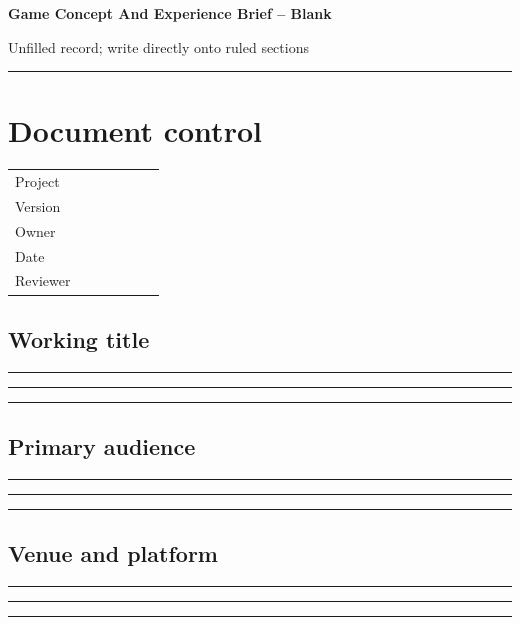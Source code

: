 \documentclass[11pt]{article}
\begin{document}
{\huge\bfseries\color{suiteblue} Game Concept And Experience Brief -- Blank}\par
\vspace{0.15in}
{\normalsize\color{suitegray} Unfilled record; write directly onto ruled sections}\par
\vspace{0.15in}\hrule\vspace{0.15in}

\section{Document control}
\renewcommand{\arraystretch}{1.8}
\begin{tabularx}{\linewidth}{@{}p{0.30\linewidth}X@{}}\toprule
Project & \hrulefill\\ Version & \hrulefill\\ Owner & \hrulefill\\ Date & \hrulefill\\ Reviewer & \hrulefill\\ \bottomrule\end{tabularx}

\subsection{Working title}
\noindent\rule{\linewidth}{0.3pt}\par\vspace{0.18in}
\noindent\rule{\linewidth}{0.3pt}\par\vspace{0.18in}
\noindent\rule{\linewidth}{0.3pt}\par\vspace{0.14in}

\subsection{Primary audience}
\noindent\rule{\linewidth}{0.3pt}\par\vspace{0.18in}
\noindent\rule{\linewidth}{0.3pt}\par\vspace{0.18in}
\noindent\rule{\linewidth}{0.3pt}\par\vspace{0.14in}

\subsection{Venue and platform}
\noindent\rule{\linewidth}{0.3pt}\par\vspace{0.18in}
\noindent\rule{\linewidth}{0.3pt}\par\vspace{0.18in}
\noindent\rule{\linewidth}{0.3pt}\par\vspace{0.14in}
\end{document}
